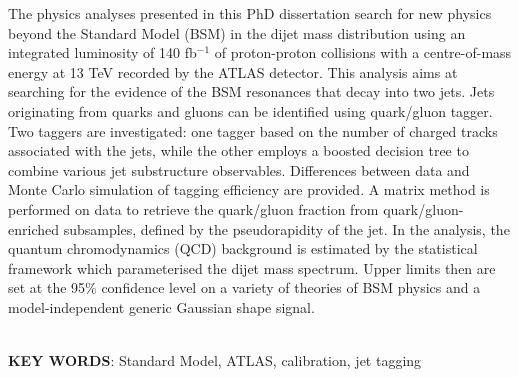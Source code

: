 \documentclass[UTF8,12pt]{ctexart}
\numberwithin{equation}{section}
\renewcommand{\rm}{\mathrm}
\def\vs{\vspace*{1mm}}
\def\ifb{fb$^{-1}$ }
\begin{document}
The physics analyses presented in this PhD dissertation search for new physics beyond the Standard Model (BSM) in the dijet mass distribution using an integrated luminosity of 140 \ifb of proton-proton collisions with a centre-of-mass energy at 13 TeV recorded by the ATLAS detector. This analysis aims at searching for the evidence of the BSM resonances that decay into two jets.
Jets originating from quarks and gluons can be identified using quark/gluon tagger. Two taggers are investigated: one tagger based on the number of charged tracks associated with the jets, while the other employs a boosted decision tree to combine various jet substructure observables. Differences between data and Monte Carlo simulation of tagging efficiency are provided. A matrix method is performed on data to retrieve the quark/gluon fraction from quark/gluon-enriched subsamples, defined by the pseudorapidity of the jet. In the analysis, the quantum chromodynamics (QCD) background is estimated by the statistical framework which parameterised the dijet mass spectrum. Upper limits then are set at the 95\% confidence level on a variety of theories of BSM physics and a model-independent generic Gaussian shape signal.





~\\ 
\textbf{KEY WORDS}: 
Standard Model, ATLAS, calibration, jet tagging


\newpage 




\renewcommand\contentsname{\textbf{Contents}}


\tableofcontents\thispagestyle{fancy}
\end{document}
